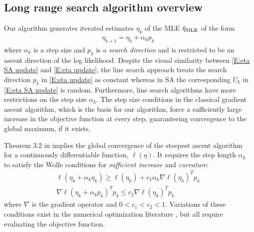 

\subsection{Long range search algorithm overview}  \label{S:algorithm overview}

Our algorithm generates iterated estimates $\eta_k$ of the MLE $\hat{\eta}_{\textrm{MLE}}$ of the 
form 
\begin{align} \label{E:eta update}
	\eta_{k+1} = \eta_k + \alpha_k p_k
\end{align}
where $\alpha_k$ is a step size and $p_k$ is a \emph{search direction} and is 
restricted to be an ascent direction of 
the log likelihood.  
Despite the visual similarity between \eqref{E:eta SA update} and \eqref{E:eta 
update}, the line search approach treats 
the search direction $p_k$ in \eqref{E:eta update} as constant whereas in SA the 
corresponding $U_k$ in \eqref{E:eta SA update} is random.
Furthermore, line search algorithms have more restrictions on the step size $\alpha_k$.  
The step size 
conditions in the classical gradient ascent algorithm, which is the basis for our 
algorithm, force  a sufficiently 
large increase in the objective function at every step, guaranteeing convergence to 
the global maximum, if it exists.

Theorem 3.2 in \citep{NW} implies the global convergence of the steepest ascent 
algorithm for a continuously differentiable function, $\ell(\eta)$.  It requires the 
step length $\alpha_k$ to satisfy 
the Wolfe conditions for \emph{sufficient increase} and \emph{curvature}:
\begin{equation} \label{eq:wolfe}
\begin{split}
	\ell(\eta_k + \alpha_k \eta_k) \geq \ell(\eta_k) + c_1 \alpha_k \nabla \ell (\eta_k)^T p_k \\
	\nabla \ell( \eta_k + \alpha_k p_k)^T p_k \leq c_2 \nabla \ell( \eta_k)^T p_k
\end{split}
\end{equation}
where $\nabla$ is the gradient operator and $0 < c_1 < c_2 < 1$.   
Variations of these conditions exist in the numerical optimization literature \citep
{Fletcher,NW,Sun:2006}, but all 
require evaluating the objective function.

